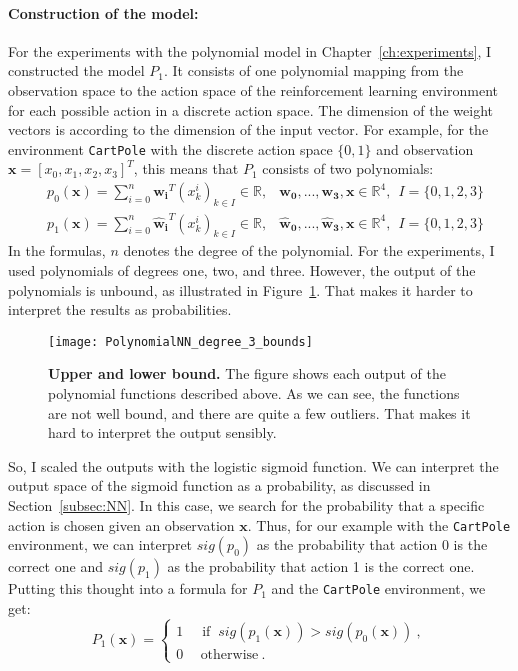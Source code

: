 \paragraph*{Construction of the model:} For the experiments with the polynomial model in Chapter~\ref{ch:experiments}, I constructed the model $P_1$. It consists of one polynomial mapping from the observation space to the action space of the reinforcement learning environment for each possible action in a discrete action space. The dimension of the weight vectors is according to the dimension of the input vector. For example, for the environment \verb|CartPole| with the discrete action space $\{0, 1\}$ and observation $\mathbf{x} = [x_0, x_1, x_2, x_3]^T$, this means that $P_1$ consists of two polynomials:
\begin{align*}
  &p_0(\mathbf{x}) = \sum_{i=0}^{n} \mathbf{w_i}^T (x_k^i)_{k \in I} \in \mathbb{R}, &\mathbf{w_0}, ..., \mathbf{w_3}, \mathbf{x} \in \mathbb{R}^4, \ \ I = \{0, 1, 2, 3\} \\
  &p_1(\mathbf{x}) = \sum_{i=0}^{n} \mathbf{\hat{w}_i}^T (x_k^i)_{k \in I} \in \mathbb{R}, &\mathbf{\hat{w}_0}, ..., \mathbf{\hat{w}_3}, \mathbf{x} \in \mathbb{R}^4, \ \ I = \{0, 1, 2, 3\}
\end{align*}
In the formulas, $n$ denotes the degree of the polynomial. For the experiments, I used polynomials of degrees one, two, and three. However, the output of the polynomials is unbound, as illustrated in Figure~\ref{fig:bounds}. That makes it harder to interpret the results as probabilities.
\begin{figure}[ht]
\centering
\texttt{[image: PolynomialNN\_degree\_3\_bounds]}
\caption[Upper and lower bound]{
  \textbf{Upper and lower bound.}
  The figure shows each output of the polynomial functions described above. As we can see, the functions are not well bound, and there are quite a few outliers. That makes it hard to interpret the output sensibly.
}
\label{fig:bounds}
\end{figure}
So, I scaled the outputs with the logistic sigmoid function. We can interpret the output space of the sigmoid function as a probability, as discussed in Section~\ref{subsec:NN}. In this case, we search for the probability that a specific action is chosen given an observation $\mathbf{x}$. Thus, for our example with the \verb|CartPole| environment, we can interpret $sig(p_0)$ as the probability that action 0 is the correct one and $sig(p_1)$ as the probability that action 1 is the correct one. Putting this thought into a formula for $P_1$ and the \verb|CartPole| environment, we get:
\[
  P_1(\mathbf{x}) =
  \begin{cases}1~&{\text{ if }}~sig(p_1(\mathbf{x})) > sig(p_0(\mathbf{x}))~,\\0~&~\text{otherwise}~.\end{cases}
\]

